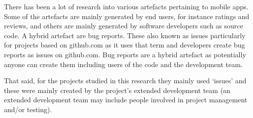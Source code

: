 There has been a lot of research into various artefacts pertaining to mobile apps. Some of the artefacts are mainly generated by end users, for instance ratings and reviews, and others are mainly generated by software developers such as source code. A hybrid artefact are bug reports. These also known as issues particularly for projects based on github.com as it uses that term and developers create bug reports as issues on github.com. Bug reports are a hybrid artefact as potentially anyone can create them including users of the code and the development team. 

That said, for the projects studied in this research they mainly used `issues' and these were mainly created by the project's extended development team (an extended development team may include people involved in project management and/or testing).

